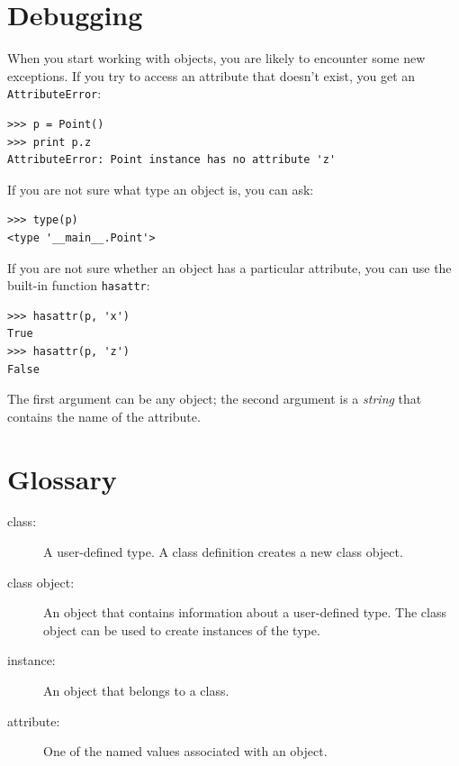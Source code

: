 \documentclass[10pt]{book}
\begin{document}
\begin{CJK}{UTF8}{gbsn}
\begin{exercise}
\end{exercise}


\section{Debugging}
\label{hasattr}

When you start working with objects, you are likely to encounter
some new exceptions.  If you try to access an attribute
that doesn't exist, you get an {\tt AttributeError}:

\begin{verbatim}
>>> p = Point()
>>> print p.z
AttributeError: Point instance has no attribute 'z'
\end{verbatim}
%
If you are not sure what type an object is, you can ask:

\begin{verbatim}
>>> type(p)
<type '__main__.Point'>
\end{verbatim}
%
If you are not sure whether an object has a particular attribute,
you can use the built-in function {\tt hasattr}:

\begin{verbatim}
>>> hasattr(p, 'x')
True
>>> hasattr(p, 'z')
False
\end{verbatim}
%
The first argument can be any object; the second argument is a {\em
string} that contains the name of the attribute.


\section{Glossary}

\begin{description}

\item[class:] A user-defined type.  A class definition creates a new
class object.

\item[class object:] An object that contains information about a
user-defined type.  The class object can be used to create instances
of the type.

\item[instance:] An object that belongs to a class.

\item[attribute:] One of the named values associated with an object.


\end{description}
\end{CJK}
\end{document}
